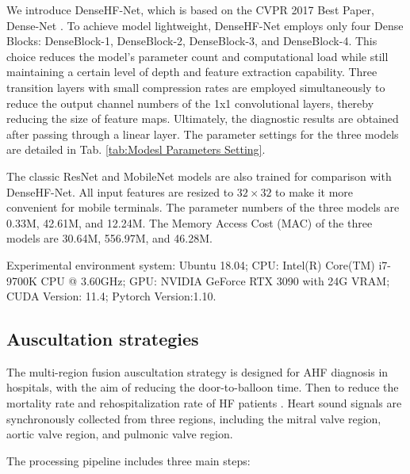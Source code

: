 We introduce DenseHF-Net, which is based on the CVPR 2017 Best Paper, Dense-Net \cite{huang2017densely}. 
To achieve model lightweight, DenseHF-Net employs only four Dense Blocks: DenseBlock-1, DenseBlock-2, DenseBlock-3, and DenseBlock-4. This choice reduces the model's parameter count and computational load while still maintaining a certain level of depth and feature extraction capability. Three transition layers with small compression rates are employed simultaneously to reduce the output channel numbers of the 1x1 convolutional layers, thereby reducing the size of feature maps. Ultimately, the diagnostic results are obtained after passing through a linear layer. The parameter settings for the three models are detailed in Tab. \ref{tab:Modesl Parameters Setting}.

The classic ResNet \cite{he2016deep} and MobileNet \cite{howard2017mobilenets} models are also trained for comparison with DenseHF-Net. All input features are resized to $32\times32$ to make it more convenient for mobile terminals. The parameter numbers of the three models are 0.33M, 42.61M, and 12.24M. The Memory Access Cost (MAC) of the three models are 30.64M, 556.97M, and 46.28M.

Experimental environment system: Ubuntu 18.04; CPU: Intel(R) Core(TM) i7-9700K CPU @ 3.60GHz; GPU: NVIDIA GeForce RTX 3090 with 24G VRAM; CUDA Version: 11.4; Pytorch Version:1.10.
\subsection{Auscultation strategies}
The multi-region fusion auscultation strategy is designed for AHF diagnosis in hospitals, with the aim of reducing the door-to-balloon time. Then to reduce the mortality rate and rehospitalization rate of HF patients \cite{fan2021effects}. Heart sound signals are synchronously collected from three regions, including the mitral valve region, aortic valve region, and pulmonic valve region.

The processing pipeline includes three main steps:

